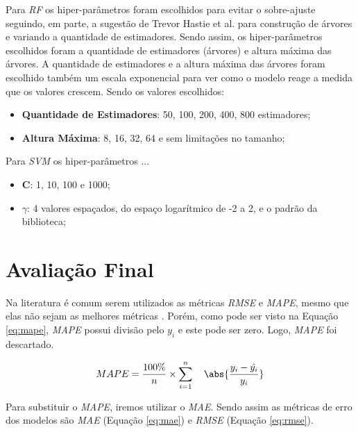 Para \textit{\acrshort{RF}} os hiper-parâmetros foram escolhidos para evitar o sobre-ajuste seguindo, em parte, a sugestão de Trevor Hastie et al. \cite{hastie2005elements} para construção de árvores e variando a quantidade de estimadores. Sendo assim, os hiper-parâmetros escolhidos foram a quantidade de estimadores (árvores) e altura máxima das árvores. A quantidade de estimadores e a altura máxima das árvores foram escolhido também um escala exponencial para ver como o modelo reage a medida que os valores crescem.  Sendo os valores escolhidos:

\begin{itemize}
    \item \textbf{Quantidade de Estimadores}: 50, 100, 200, 400, 800 estimadores;
    \item \textbf{Altura Máxima}: 8, 16, 32, 64 e sem limitações no tamanho;
\end{itemize}

Para \textit{\acrshort{SVM}} os hiper-parâmetros ...

\begin{itemize}
    \item \textbf{C}: 1, 10, 100 e 1000;
    \item \textbf{\(\gamma\)}: 4 valores espaçados, do espaço logarítmico de -2 a 2, e o padrão da biblioteca; 
\end{itemize}

\section{Avaliação Final}

Na literatura é comum serem utilizados as métricas \textit{\acrfull{RMSE}} e \textit{\acrfull{MAPE}}, mesmo que elas não sejam as melhores métricas \cite{lana_2018}. Porém, como pode ser visto na Equação \ref{eq:mape}, \textit{\acrshort{MAPE}} possui divisão pelo \({y_i}\) e este pode ser zero. Logo, \textit{\acrshort{MAPE}} foi descartado. 

\begin{equation}
\label{eq:mape}
MAPE = \frac{100\%}{n} \times \sum_{i=1}^{n} \quad \abs{\frac{y_i - \hat{y_i}}{y_i}}
\end{equation}

Para substituir o \textit{\acrshort{MAPE}}, iremos utilizar o \textit{\acrfull{MAE}}. Sendo assim as métricas de erro dos modelos são \textit{\acrshort{MAE}} (Equação \ref{eq:mae}) e \textit{\acrshort{RMSE}} (Equação \ref{eq:rmse}).

